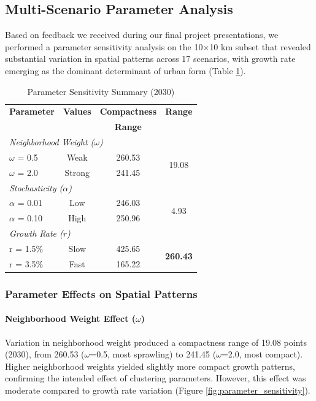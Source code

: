 \documentclass[12pt,a4paper]{article}
\begin{document}
\subsection{Multi-Scenario Parameter Analysis}

Based on feedback we received during our final project presentations, we performed a parameter sensitivity analysis on the 10$\times$10 km subset that revealed substantial variation in spatial patterns across 17 scenarios, with growth rate emerging as the dominant determinant of urban form (Table \ref{tab:scenario_metrics_summary}).
\begin{table}[H]
\caption{Parameter Sensitivity Summary (2030)}
\label{tab:scenario_metrics_summary}
\centering
\small
\renewcommand{\arraystretch}{1.2}
\begin{tabular}{lccc}
\toprule
\textbf{Parameter} & \textbf{Values} & \textbf{Compactness} & \textbf{Range} \\
 & & \textbf{Range} & \\
\midrule
\multicolumn{4}{l}{\textit{Neighborhood Weight ($\omega$)}} \\
\quad $\omega$ = 0.5 & Weak & 260.53 & \multirow{2}{*}{19.08} \\
\quad $\omega$ = 2.0 & Strong & 241.45 & \\
\midrule
\multicolumn{4}{l}{\textit{Stochasticity ($\alpha$)}} \\
\quad $\alpha$ = 0.01 & Low & 246.03 & \multirow{2}{*}{4.93} \\
\quad $\alpha$ = 0.10 & High & 250.96 & \\
\midrule
\multicolumn{4}{l}{\textit{Growth Rate ($r$)}} \\
\quad r = 1.5\% & Slow & 425.65 & \multirow{2}{*}{\textbf{260.43}} \\
\quad r = 3.5\% & Fast & 165.22 & \\
\bottomrule
\end{tabular}
\end{table}
\subsubsection{Parameter Effects on Spatial Patterns}

\paragraph{Neighborhood Weight Effect ($\omega$)}
Variation in neighborhood weight produced a compactness range of 19.08 points (2030), from 260.53 ($\omega$=0.5, most sprawling) to 241.45 ($\omega$=2.0, most compact). Higher neighborhood weights yielded slightly more compact growth patterns, confirming the intended effect of clustering parameters. However, this effect was moderate compared to growth rate variation (Figure \ref{fig:parameter_sensitivity}).
\end{document}
